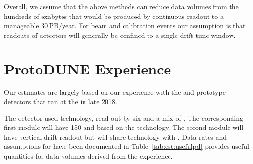 \documentclass[../main-v1.tex]{subfiles}
\begin{document}
Overall, we assume that the above methods can reduce data volumes from the hundreds of exabytes that would be produced by continuous readout to a manageable 30\,PB/year. For beam and calibration events our assumption is that readouts of  detectors will  generally be confined to a single drift time window.




\section{ProtoDUNE Experience}
\label{sec:est:ProtoDUNE}  

Our estimates  are largely based on our experience with the  
 and  prototype detectors that ran at the  in late 2018. 

The  detector used   technology, read out by six  and a mix of . The corresponding first  module will have 150  and  based on the  technology. The second  module will have  vertical drift readout but will share technology with  
. Data rates and assumptions for  have been documented in  Table~\ref{tab:est:usefulpd} provides useful quantities for data volumes derived from the  experience. 
\end{document}
